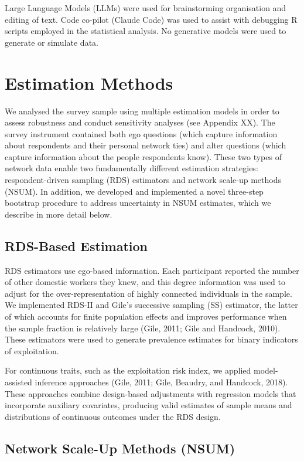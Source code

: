\documentclass[
  12pt,
  letterpaper,
  DIV=11,
  numbers=noendperiod]{scrartcl}
\theoremstyle{plain}
\theoremstyle{definition}
\begin{document}
Large Language Models (LLMs) were used for brainstorming organisation
and editing of text. Code co-pilot (Claude Code) was used to assist with
debugging R scripts employed in the statistical analysis. No generative
models were used to generate or simulate data.

\section{Estimation Methods}\label{estimation-methods}

We analysed the survey sample using multiple estimation models in order
to assess robustness and conduct sensitivity analyses (see Appendix XX).
The survey instrument contained both ego questions (which capture
information about respondents and their personal network ties) and alter
questions (which capture information about the people respondents know).
These two types of network data enable two fundamentally different
estimation strategies: respondent-driven sampling (RDS) estimators and
network scale-up methods (NSUM). In addition, we developed and
implemented a novel three-step bootstrap procedure to address
uncertainty in NSUM estimates, which we describe in more detail below.

\subsection{RDS-Based Estimation}\label{rds-based-estimation}

RDS estimators use ego-based information. Each participant reported the
number of other domestic workers they knew, and this degree information
was used to adjust for the over-representation of highly connected
individuals in the sample. We implemented RDS-II and Gile's successive
sampling (SS) estimator, the latter of which accounts for finite
population effects and improves performance when the sample fraction is
relatively large (Gile, 2011; Gile and Handcock, 2010). These estimators
were used to generate prevalence estimates for binary indicators of
exploitation.

For continuous traits, such as the exploitation risk index, we applied
model-assisted inference approaches (Gile, 2011; Gile, Beaudry, and
Handcock, 2018). These approaches combine design-based adjustments with
regression models that incorporate auxiliary covariates, producing valid
estimates of sample means and distributions of continuous outcomes under
the RDS design.

\subsection{Network Scale-Up Methods
(NSUM)}\label{network-scale-up-methods-nsum}
\end{document}
